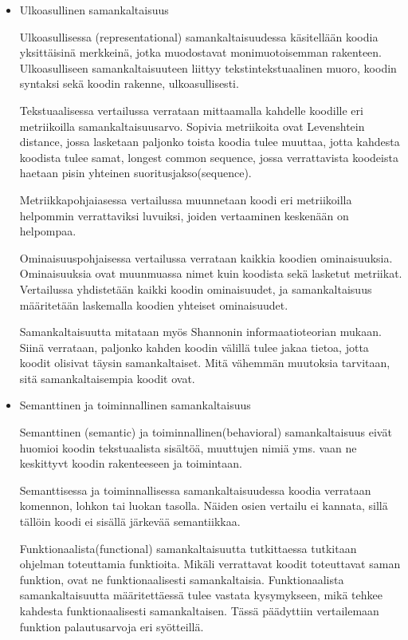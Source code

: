 \documentclass[finnish]{tktltiki2}
\theoremstyle{definition}
\theoremstyle{remark}
\begin{document}
\begin{itemize}
\item{Ulkoasullinen samankaltaisuus}

Ulkoasullisessa (representational) samankaltaisuudessa käsitellään koodia yksittäisinä merkkeinä, jotka muodostavat monimuotoisemman rakenteen. Ulkoasulliseen samankaltaisuuteen liittyy tekstintekstuaalinen muoro, koodin syntaksi sekä koodin rakenne, ulkoasullisesti.

Tekstuaalisessa vertailussa verrataan mittaamalla kahdelle koodille eri metriikoilla samankaltaisuusarvo. Sopivia metriikoita ovat Levenshtein distance, jossa lasketaan paljonko toista koodia tulee muuttaa, jotta kahdesta koodista tulee samat, longest common sequence, jossa verrattavista koodeista haetaan pisin yhteinen suoritusjakso(sequence). 

Metriikkapohjaiasessa vertailussa muunnetaan koodi eri metriikoilla helpommin verrattaviksi luvuiksi, joiden vertaaminen keskenään on helpompaa. 

Ominaisuuspohjaisessa vertailussa verrataan kaikkia koodien ominaisuuksia. Ominaisuuksia ovat muunmuassa  nimet kuin koodista sekä lasketut metriikat. Vertailussa yhdistetään kaikki koodin ominaisuudet, ja samankaltaisuus määritetään laskemalla koodien yhteiset ominaisuudet.

Samankaltaisuutta mitataan myös Shannonin informaatioteorian mukaan. Siinä verrataan, paljonko kahden koodin välillä tulee jakaa tietoa, jotta koodit olisivat täysin samankaltaiset. Mitä vähemmän muutoksia tarvitaan, sitä samankaltaisempia koodit ovat.

\item{Semanttinen ja toiminnallinen samankaltaisuus}

Semanttinen (semantic) ja toiminnallinen(behavioral) samankaltaisuus eivät huomioi koodin tekstuaalista sisältöä, muuttujen nimiä yms. vaan ne keskittyvt koodin rakenteeseen ja toimintaan.

Semanttisessa ja toiminnallisessa samankaltaisuudessa koodia verrataan komennon, lohkon tai luokan tasolla. Näiden osien vertailu ei kannata, sillä tällöin koodi ei sisällä järkevää semantiikkaa.

Funktionaalista(functional) samankaltaisuutta tutkittaessa tutkitaan ohjelman toteuttamia funktioita. Mikäli verrattavat koodit toteuttavat saman funktion, ovat ne funktionaalisesti samankaltaisia. Funktionaalista samankaltaisuutta määritettäessä tulee vastata kysymykseen, mikä tehkee kahdesta funktionaalisesti samankaltaisen. Tässä päädyttiin vertailemaan funktion palautusarvoja eri syötteillä.


\end{itemize}
\end{document}
